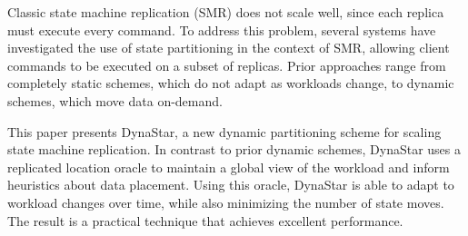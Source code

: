 
Classic state machine replication (SMR) does not scale well, since
each replica must execute every command.  To address this problem,
several systems have investigated the use of state partitioning in the
context of SMR, allowing client commands to be executed on a subset of
replicas. Prior approaches range from completely static schemes, which do not
adapt as workloads change, to dynamic schemes, which move data on-demand.


This paper presents DynaStar, a new dynamic partitioning scheme for
scaling state machine replication. In contrast to prior dynamic
schemes, DynaStar uses a replicated location oracle to maintain a global view
of the workload and inform heuristics about data placement. Using this
oracle, DynaStar is able to adapt to workload changes over time,
while also minimizing the number of state moves. The result is a
practical technique that achieves excellent performance.


